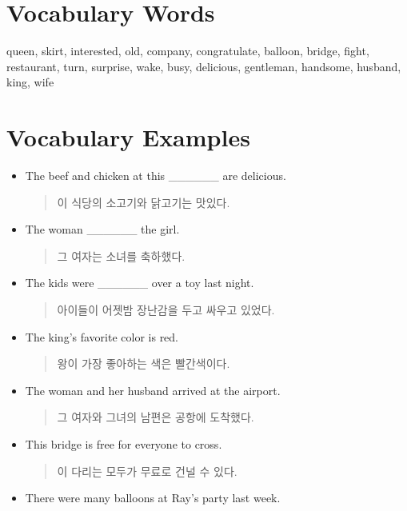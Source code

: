 \documentclass{article}
\begin{document}
\renewcommand{\familydefault}{\sfdefault}
\onehalfspacing
\fontsize{12pt}{14pt}\selectfont

\section*{Vocabulary Words}
\begin{addmargin}[1em]{1em}
queen, skirt, interested, old, company, congratulate, balloon, bridge, fight, restaurant, turn, surprise, wake, busy, delicious, gentleman, handsome, husband, king, wife
\end{addmargin}

\section*{Vocabulary Examples}
\begin{addmargin}[1em]{1em}
\begin{itemize}
    \item The beef and chicken at this \_\_\_\_\_\_ are delicious.
    \begin{quote}
    이 식당의 소고기와 닭고기는 맛있다.
    \end{quote}
    \item The woman \_\_\_\_\_\_ the girl.
    \begin{quote}
    그 여자는 소녀를 축하했다.
    \end{quote}
    \item The kids were \_\_\_\_\_\_ over a toy last night.
    \begin{quote}
    아이들이 어젯밤 장난감을 두고 싸우고 있었다.
    \end{quote}
    \item The king's favorite color is red.
    \begin{quote}
    왕이 가장 좋아하는 색은 빨간색이다.
    \end{quote}
    \item The woman and her husband arrived at the airport.
    \begin{quote}
    그 여자와 그녀의 남편은 공항에 도착했다.
    \end{quote}
    \item This bridge is free for everyone to cross.
    \begin{quote}
    이 다리는 모두가 무료로 건널 수 있다.
    \end{quote}
    \item There were many balloons at Ray's party last week.
    \begin{quote}

\end{quote}
\end{itemize}
\end{addmargin}
\end{document}
